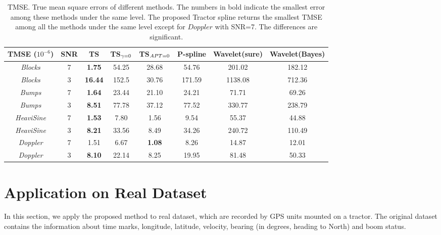 \begin{table}
	\centering
	\caption{TMSE. True mean square errors of different methods. The numbers in bold indicate the smallest error among these methods under the same level. The proposed Tractor spline returns the smallest TMSE among all the methods under the same level except for $\textit{Doppler}$ with SNR=7. The differences are significant. }\label{tmse3200}
	\setlength\tabcolsep{1.5pt}
	\begin{tabular}{|c|c| c| c| c|c|c|c|}
\hline	TMSE ($10^{-6}$)  & SNR & TS & TS$_{\footnotesize\gamma=0}$ & TS$_{\footnotesize APT=0}$  & P-spline & Wavelet(sure) & Wavelet(Bayes)\\ \hline
		\textit{Blocks}    & 7   & \textbf{1.75} & 54.25 &  28.68   & 54.76   & 201.02   & 182.12   \\ \hline
		\textit{Blocks}    & 3   & \textbf{16.44} & 152.5 & 30.76  & 171.59   & 1138.08  & 712.36  \\ \hline
		\textit{Bumps}     & 7  & \textbf{1.64} & 23.44  & 21.10     & 24.21 & 71.71 & 69.26 \\ \hline
		\textit{Bumps}     & 3  & \textbf{8.51} & 77.78  &37.12     & 77.52 & 330.77 & 238.79 \\ \hline
		\textit{HeaviSine} & 7 & \textbf{1.53}& 7.80  & 1.56     & 9.54   & 55.37  &44.88  \\ \hline
		\textit{HeaviSine} & 3 & \textbf{8.21}& 33.56  & 8.49 & 34.26 & 240.72& 110.49\\ \hline
		\textit{Doppler}   & 7   & 1.51& 6.67  & \textbf{1.08}   &  8.26   & 14.87  & 12.01  \\ \hline
		\textit{Doppler}   & 3   & \textbf{8.10} & 22.14  & 8.25   & 19.95    &81.48  &50.33   \\ \hline
	\end{tabular}	
\end{table}



\section{Application on Real Dataset}\label{splineapplication}

In this section, we apply the proposed method to real dataset, which are recorded by GPS units mounted on a tractor. The original dataset contains the information about time marks, longitude, latitude, velocity, bearing (in degrees,  heading to North) and boom status. 


